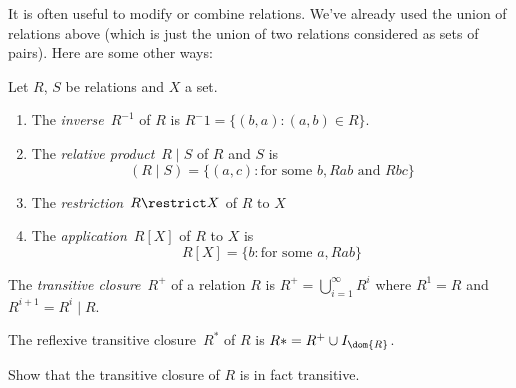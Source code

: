 \documentclass[../../include/open-logic-section]{subfiles}
\begin{document}

It is often useful to modify or combine relations. We've already used
the union of relations above (which is just the union of two relations
considered as sets of pairs). Here are some other ways:

\begin{defn} Let $R$, $S$ be relations and $X$ a set.
\begin{enumerate}
\item The \emph{inverse}~$R^{-1}$ of $R$ is $R^-1 = \{ (b, a) : (a, b)
  \in R\}$.
\item The \emph{relative product}~$R \mid S$ of $R$ and $S$ is 
\[
(R \mid S) = \{(a, c) : \text{for some }b, Rab \text{ and } Rbc\}
\]
\item The \emph{restriction}~$R \restrict X$ of $R$ to $X$
\item The \emph{application}~$R[X]$ of $R$ to $X$ is
\[
R[X] = \{b : \text{for some }a, Rab\}
\]
\end{enumerate}
\end{defn}

\begin{defn}
The \emph{transitive closure}~$R^+$ of a relation $R$ is $R^+ =
\bigcup_{i=1}^\infty R^i$ where $R^1 = R$ and $R^{i+1} = R^i \mid R$.

The reflexive transitive closure~$R^*$ of $R$ is $R* = R^+ \cup
I_{\dom{R}}$.
\end{defn}

\begin{prob}
Show that the transitive closure of $R$ is in fact transitive.
\end{prob}
\end{document}

